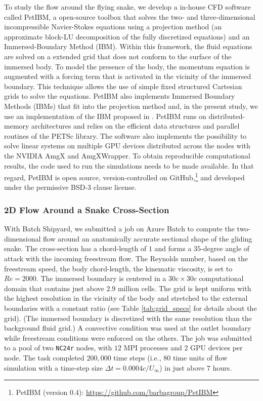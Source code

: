 \documentclass[10pt,journal,compsoc]{IEEEtran}
\begin{document}
To study the flow around the flying snake, we develop a in-house CFD software called PetIBM\cite{chuang_et_al_2018}, a open-source toolbox that solves the two- and three-dimensional incompressible Navier-Stokes equations using a projection method (an approximate block-LU decomposition of the fully discretized equations\cite{perot_1993}) and an Immersed-Boundary Method (IBM).
Within this framework, the fluid equations are solved on a extended grid that does not conform to the surface of the immersed body.
To model the presence of the body, the momentum equation is augmented with a forcing term that is activated in the vicinity of the immersed boundary.
This technique allows the use of simple fixed structured Cartesian grids to solve the equations.
PetIBM also implements Immersed Boundary Methods (IBMs) that fit into the projection method and, in the present study, we use an implementation of the IBM proposed in \cite{li_et_al_2016}.
PetIBM runs on distributed-memory architectures and relies on the efficient data structures and parallel routines of the PETSc library.
The software also implements the possibility to solve linear systems on multiple GPU devices distributed across the nodes with the NVIDIA AmgX and AmgXWrapper\cite{chuang_barba_2017}.
To obtain reproducible computational results, the code used to run the simulations needs to be made available.
In that regard, PetIBM is open source, version-controlled on GitHub,\footnote{PetIBM (version 0.4): \url{https://github.com/barbagroup/PetIBM}} and developed under the permissive BSD-3 clause license.

\subsubsection{2D Flow Around a Snake Cross-Section}

With Batch Shipyard, we submitted a job on Azure Batch to compute the two-dimensional flow around an anatomically accurate sectional shape of the gliding snake.
The cross-section has a chord-length of $1$ and forms a $35$-degree angle of attack with the incoming freestream flow.
The Reynolds number, based on the freestream speed, the body chord-length, the kinematic viscosity, is set to $Re=2000$.
The immersed boundary is centered in a $30c \times 30c$ computational domain that contains just above $2.9$ million cells.
The grid is kept uniform with the highest resolution in the vicinity of the body and stretched to the external boundaries with a constant ratio (see Table \ref{tab:grid_specs} for details about the grid).
(The immersed boundary is discretized with the same resolution than the background fluid grid.)
A convective condition was used at the outlet boundary while freestream conditions were enforced on the others.
The job was submitted to a pool of two \texttt{NC24r} nodes, with $12$ MPI processes and $2$ GPU devices per node.
The task completed $200,000$ time steps (i.e., $80$ time units of flow simulation with a time-step size $\Delta t = 0.0004 c / U_\infty$) in just above $7$ hours.
\end{document}
